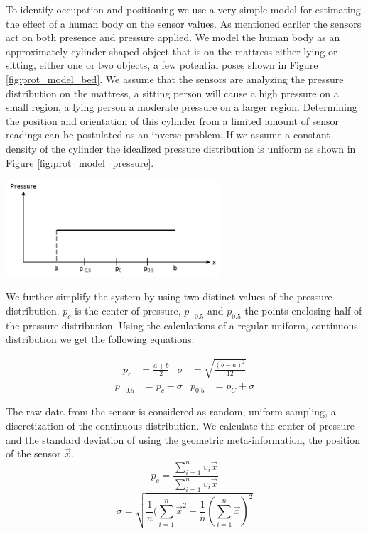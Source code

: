 To identify occupation and positioning we use a very simple model for estimating the effect of a human body on the sensor values. As mentioned earlier the sensors act on both presence and pressure applied. We model the human body as an approximately cylinder shaped object that is on the mattress either lying or sitting, either one or two objects, a few potential poses shown in Figure \ref{fig:prot_model_bed}. We assume that the sensors are analyzing the pressure distribution on the mattress, a sitting person will cause a high pressure on a small region, a lying person a moderate pressure on a larger region. Determining the position and orientation of this cylinder from a limited amount of sensor readings can be postulated as an inverse problem. If we assume a constant density of the cylinder the idealized pressure distribution is uniform as shown in Figure \ref{fig:prot_model_pressure}.

\begin{minipage}{\linewidth}
\centering
\includegraphics[width=0.6\textwidth]{images/prot_model_pressure}
\label{fig:prot_model_pressure}
\end{minipage}

We further simplify the system by using two distinct values of the pressure distribution. $p_c$ is the center of pressure, $p_{-0.5}$ and $p_{0.5}$ the points enclosing half of the pressure distribution. Using the calculations of a regular uniform, continuous distribution we get the following equations:

\begin{align}
p_c&=\frac{a+b}{2} & \sigma&=\sqrt{\frac{(b-a)^2}{12}}
\end{align}
\begin{align}
p_{-0.5}&=p_c-\sigma &	p_{0.5}&=p_C+\sigma
\end{align}

The raw data from the sensor is considered as random, uniform sampling, a discretization of the continuous distribution. We calculate the center of pressure and the standard deviation of using the geometric meta-information, the position of the sensor $\overrightarrow{x}$.
\begin{equation}
p_c=\frac{\sum_{i=1}^n{v_i\overrightarrow{x}}}{\sum_{i=1}^n{v_i\overrightarrow{x}}}
\end{equation}
\begin{equation}
\sigma=\sqrt{\frac{1}{n}(\sum_{i=1}^n{\overrightarrow{x}^2}-\frac{1}{n}(\sum_{i=1}^n{\overrightarrow{x}})^2}
\end{equation}


